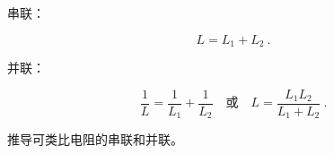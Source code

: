 
\begin{issues}
\issueDraft
\end{issues}


串联：

\begin{equation}
L = L_1 + L_2~.
\end{equation}

并联：

\begin{equation}
\frac{1}{L} = \frac{1}{L_1} + \frac{1}{L_2}
\quad \text{或} \quad
L = \frac{L_1L_2}{L_1 + L_2}~.
\end{equation}

推导可类比电阻的串联和并联。
